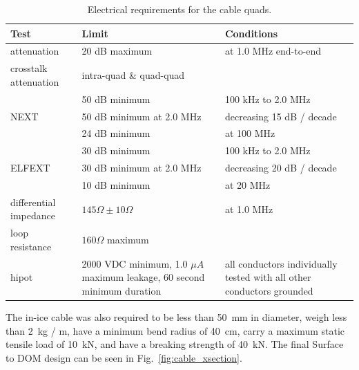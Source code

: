 \begin{table}[h]
  \centering
  \begin{tabularx}{\textwidth}{| l | X | X | }
    \hline
    \bf{Test} & \bf{Limit} & \bf{Conditions} \\
    \hline

    attenuation & 20 dB maximum & at 1.0 MHz end-to-end \\
    \hline

    crosstalk attenuation & intra-quad \& quad-quad & \\
    \hline

    & 50 dB minimum & 100 kHz to 2.0 MHz \\
    \cline {2-3}
    NEXT & 50 dB minimum at 2.0 MHz & decreasing 15 dB / decade \\
    \cline {2-3}
    & 24 dB minimum & at 100 MHz \\
    \hline

    & 30 dB minimum & 100 kHz to 2.0 MHz \\
    \cline {2-3}
    ELFEXT & 30 dB minimum at 2.0 MHz & decreasing 20 dB / decade \\
    \cline {2-3}
    & 10 dB minimum & at 20 MHz \\
    \hline

    differential impedance & $145\Omega \pm 10\Omega$ & at 1.0 MHz \\
    \hline

    loop resistance & $160\Omega$ maximum & \\
    \hline

    hipot & 2000 VDC minimum, 1.0 $\mu A$ maximum leakage, 60 second
    minimum duration & all conductors individually tested with all other
    conductors grounded \\
    \hline    
  \end{tabularx}
  \caption{Electrical requirements for the cable quads.} 
  \label{tab:quad_requirements}
\end{table}

 The in-ice cable was also required to be less than 50~mm in
 diameter, weigh less than 2~kg / m, have a minimum bend radius of 40~cm,
 carry a maximum static tensile load of 10~kN, and have a breaking strength
 of 40~kN. The final Surface to DOM design can be seen in
 Fig.~\ref{fig:cable_xsection}.  

